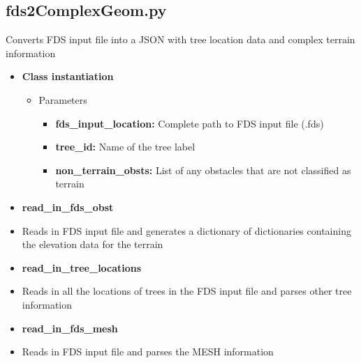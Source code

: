 \subsection{fds2ComplexGeom.py}
Converts FDS input file into a JSON with tree location data and complex terrain information
\label{PythonComplexGeom}
\begin{itemize}
    \item \textbf{Class instantiation}
    \begin{itemize}    
    \item Parameters   
        \begin{itemize}
        \item\textbf{fds\_input\_location:} Complete path to FDS input file (.fds)
        \item \textbf{tree\_id:} Name of the tree label
        \item \textbf{non\_terrain\_obsts:} List of any obstacles that are not classified as terrain
        \end{itemize} 
    \end{itemize}
    
    \item \textbf{read\_in\_fds\_obst}
    \item[] Reads in FDS input file and generates a dictionary of dictionaries containing the elevation data for the terrain
    
    \item \textbf{read\_in\_tree\_locations}
    \item[] Reads in all the locations of trees in the FDS input file and parses other tree information
      
    \item \textbf{read\_in\_fds\_mesh}
    \item[]  Reads in FDS input file and parses the MESH information
    

\end{itemize}
